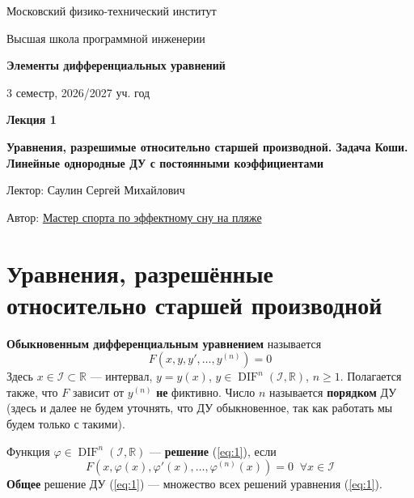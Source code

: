 \documentclass[11pt]{article}
\DeclareMathOperator{\DIF}{DIF}
\newcommand{\lectureNumber}{1}
\newcommand{\lectureTitle}{Уравнения, разрешимые относительно старшей производной. Задача Коши. Линейные однородные ДУ с постоянными коэффициентами}
\newcommand{\courseName}{Элементы дифференциальных уравнений}
\newcommand{\semester}{3 семестр, 2026/2027 уч. год}
\begin{document}
\begin{titlepage}
    \centering
    
    {\large Московский физико-технический институт \par}
    {\large Высшая школа программной инженерии \par}
    \vspace{2cm}

    {\Large \textbf{\courseName} \par}
    {\large \semester \par}
    
    \vspace*{\fill}

    {\Huge \textbf{Лекция \lectureNumber} \par}
    {\Huge \textbf{\lectureTitle} \par}
    
    \vspace*{\fill}
    
    {\large Лектор: Саулин Сергей Михайлович \par}
    {\large Автор: \href{https://t.me/ceagest}{Мастер спорта по эффектному сну на пляже} \par}

\end{titlepage}


\section{Уравнения, разрешённые относительно старшей производной}

\begin{definition}
    \textbf{Обыкновенным дифференциальным уравнением} называется 
    \begin{equation} \label{eq:1}
        F(x, y, y', \ldots, y^{(n)}) = 0
    \end{equation}
    Здесь $x \in \mathcal{I} \subset \mathbb{R}$ --- интервал, $y = y(x)$, $y \in \DIF^n(\mathcal{I}, \mathbb{R})$, $n \geq 1$. Полагается также, что $F$ зависит от $y^{(n)}$ \textbf{не} фиктивно. Число $n$ называется \textbf{порядком} ДУ (здесь и далее не будем уточнять, что ДУ обыкновенное, так как работать мы будем только с такими).
\end{definition}

\begin{definition}
    Функция $\varphi \in \DIF^{n}(\mathcal{I}, \mathbb{R})$ --- \textbf{решение} (\ref{eq:1}), если
    \[F(x, \varphi(x), \varphi'(x), \ldots, \varphi^{(n)}(x)) = 0 \; \; \forall x \in \mathcal{I}\]
    \textbf{Общее} решение ДУ (\ref{eq:1}) --- множество всех решений уравнения (\ref{eq:1}).
\end{definition}
\end{document}
